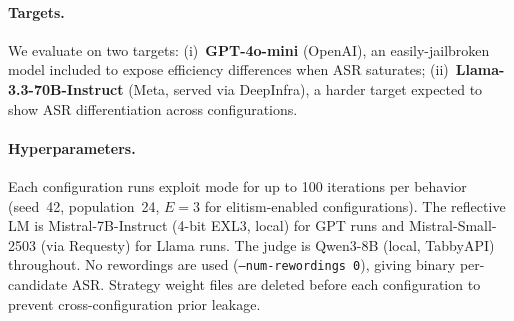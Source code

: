 \paragraph{Targets.}
We evaluate on two targets:
(i)~\textbf{GPT-4o-mini} (OpenAI), an easily-jailbroken model included to
expose efficiency differences when ASR saturates;
(ii)~\textbf{Llama-3.3-70B-Instruct} (Meta, served via DeepInfra), a
harder target expected to show ASR differentiation across configurations.

\paragraph{Hyperparameters.}
Each configuration runs exploit mode for up to 100 iterations per behavior
(seed~42, population~24, $E{=}3$ for elitism-enabled configurations).
The reflective LM is Mistral-7B-Instruct (4-bit EXL3, local) for GPT runs
and Mistral-Small-2503 (via Requesty) for Llama runs.
The judge is Qwen3-8B (local, TabbyAPI) throughout.
No rewordings are used (\texttt{--num-rewordings~0}), giving binary
per-candidate ASR.
Strategy weight files are deleted before each configuration to prevent
cross-configuration prior leakage.

